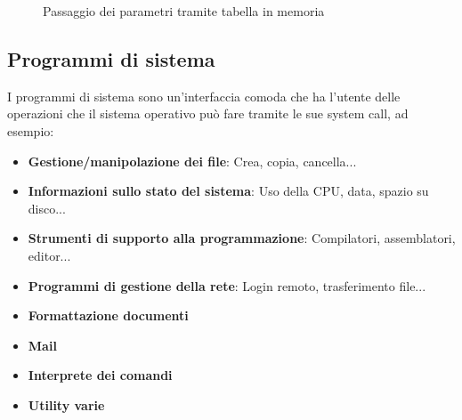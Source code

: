 \documentclass[a4paper]{article}
\begin{document}
\begin{enumerate}
\begin{figure}[H]
      \caption{Passaggio dei parametri tramite tabella in memoria}
    \end{figure}
\end{enumerate}

\subsection{Programmi di sistema}
I programmi di sistema sono un'interfaccia comoda che ha l'utente delle operazioni che il
sistema operativo può fare tramite le sue system call, ad esempio:
\begin{itemize}
  \item \textbf{Gestione/manipolazione dei file}: Crea, copia, cancella...
  \item \textbf{Informazioni sullo stato del sistema}: Uso della CPU, data, spazio su 
    disco...
  \item \textbf{Strumenti di supporto alla programmazione}: Compilatori, assemblatori,
    editor...
  \item \textbf{Programmi di gestione della rete}: Login remoto, trasferimento file...
  \item \textbf{Formattazione documenti}
  \item \textbf{Mail}
  \item \textbf{Interprete dei comandi}
  \item \textbf{Utility varie}
\end{itemize}
\end{document}
